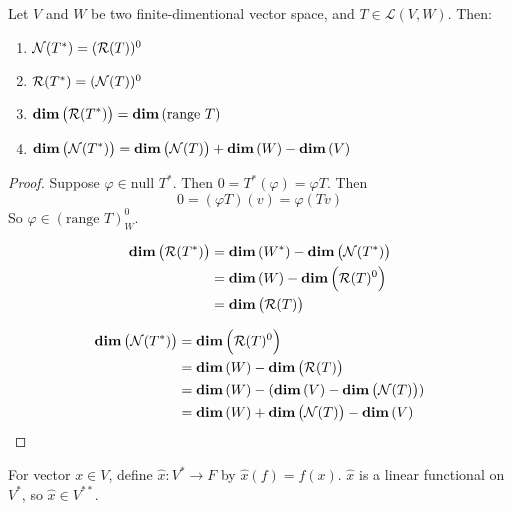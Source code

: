 \begin{theorem}
    Let $V$ and $W$ be two finite-dimentional vector space, and $T \in \mathcal{L}(V,W)$. Then:
    \begin{enumerate}
        \item $\mathcal{N}(T^*)  = (\mathcal{R}(T) )^0$
        \item $\mathcal{R}(T^*) = (\mathcal{N}(T) )^0$
        \item $\displaystyle \mathbf{dim}\left( \mathcal{R}(T^*) \right) = \displaystyle \mathbf{dim}\left( \text{range } T \right)$
        \item $\displaystyle \mathbf{dim}\left( \mathcal{N}(T^*) \right) = \displaystyle \mathbf{dim}\left( \mathcal{N}(T) \right) + \displaystyle \mathbf{dim}\left( W \right) - \displaystyle \mathbf{dim}\left( V \right)$
    \end{enumerate}
\end{theorem}

\begin{proof}
    Suppose $\varphi \in \text{null } T^*$. Then $ 0 = T^*(\varphi) = \varphi T$. Then
    \begin{equation*}
        0 = (\varphi T)(v) = \varphi (Tv) 
    \end{equation*}
    So $\varphi \in (\text{range } T)^0_W$.
    
    \begin{equation*}
        \begin{aligned}
            \displaystyle \mathbf{dim}\left( \mathcal{R}(T^*) \right) &= \displaystyle \mathbf{dim}\left( W^* \right) - \displaystyle \mathbf{dim}\left( \mathcal{N}(T^*) \right) \\
            &= \displaystyle \mathbf{dim}\left( W \right) - \displaystyle \mathbf{dim}\left( \mathcal{R}(T)^0 \right) \\
            &= \displaystyle \mathbf{dim}\left( \mathcal{R}(T) \right)
        \end{aligned}
    \end{equation*}
    
    \begin{equation*}
        \begin{aligned}
            \displaystyle \mathbf{dim}\left( \mathcal{N}(T^*) \right) &= \displaystyle \mathbf{dim}\left( \mathcal{R}(T)^0 \right)\\
            &= \displaystyle \mathbf{dim}\left( W \right) - \displaystyle \mathbf{dim}\left( \mathcal{R}(T) \right) \\
            &= \displaystyle \mathbf{dim}\left( W \right) - (\displaystyle \mathbf{dim}\left( V \right) - \displaystyle \mathbf{dim}\left( \mathcal{N}(T) \right) ) \\
            &= \displaystyle \mathbf{dim}\left( W \right) + \displaystyle \mathbf{dim}\left( \mathcal{N}(T) \right) - \displaystyle \mathbf{dim}\left( V \right)
        \end{aligned}
    \end{equation*}
\end{proof}


\begin{definition}
    For vector $x \in V$, define $\hat{x}: V^* \rightarrow F $ by $\hat{x}(f) = f(x)$. $\hat{x}$ is a linear functional on $V^*$, so $\hat{x} \in V^{**}$.
\end{definition}



